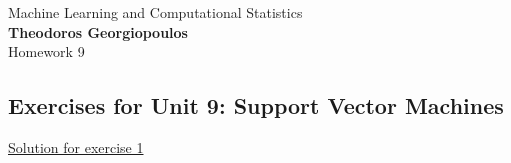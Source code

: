 \documentclass[12pt]{book}
\begin{document}
\begin{center}
{\Large Machine Learning and Computational Statistics}\\
\large\textbf{Theodoros Georgiopoulos}\\ %
\Large Homework 9 %
\end{center}

\vspace{0.2 cm}
\begin{center}
	\subsection*{Exercises for Unit 9: Support Vector Machines}
\end{center}
\vspace{0.2 cm}

{\underline{\large Solution for exercise 1}}
\vspace{0.1 cm}

\noindent
\end{document}
